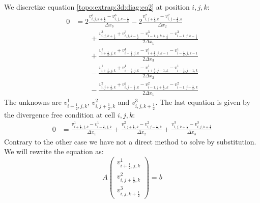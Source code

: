 We discretize equation \ref{topo:extrap:3d:diag:eq2} at position $i,j,k$:
\begin{equation}\label{extrap:3d:3:eq2}
 \begin{split}
	0&=2\frac{v^{3}_{i,j,k+\frac{1}{2}}-v^{3}_{i,j,k-\frac{1}{2}}}{\Delta x_3}-2\frac{v^{2}_{i,j+\frac{1}{2}.k}-v^{2}_{i,j-\frac{1}{2},k}}{\Delta x_2}\\
	&\qquad +\frac{v^{3}_{i,j,k+\frac{1}{2}}+v^{3}_{i,j,k-\frac{1}{2}}-v^{3}_{i-1,j,k+\frac{1}{2}}-v^{3}_{i-1,j,k-\frac{1}{2}}}{2\Delta x_1}\\
	&\qquad +\frac{v^{1}_{i+\frac{1}{2},j,k}+v^1_{i-\frac{1}{2},j,k}-v^{1}_{i+\frac{1}{2},j,k-1}-v^{1}_{i-\frac{1}{2},j,k-1}}{2\Delta x_3}\\
	&\qquad -\frac{v^{1}_{i+\frac{1}{2},j,k}+v^{1}_{i-\frac{1}{2},j,k}-v^{1}_{i+\frac{1}{2},j-1,k}-v^{1}_{i-\frac{1}{2},j-1,k}}{2\Delta x_2}\\
	&\qquad -\frac{v^{2}_{i,j+\frac{1}{2},k}+v^2_{i,j-\frac{1}{2},k}-v^{2}_{i-1,j+\frac{1}{2},k}-v^{2}_{i-1,j-\frac{1}{2},k}}{2\Delta x_1}
\end{split}
	\end{equation}
The unknowns are $v^{1}_{i+\frac{1}{2},j,k}$, $v^2_{i,j+\frac{1}{2},k}$ and $v^{3}_{i,j,k+\frac{1}{2}}$.
The last equation is given by the divergence free condition at cell $i,j,k$:
\begin{align}\label{extrap:3d:3:div}
 0&=\frac{v^{1}_{i+\frac{1}{2},j,k}-v^{1}_{i-\frac{1}{2},j,k}}{\Delta x_1}+\frac{v^{2}_{i,j+\frac{1}{2},k}-v^{2}_{i,j-\frac{1}{2},k}}{\Delta x_2}+\frac{v^{3}_{i,j,k+\frac{1}{2}}-v^{3}_{i,j,k+\frac{1}{2}}}{\Delta x_3}
\end{align}
Contrary to the other case we have not a direct method to solve by substitution. We will rewrite the equation as:
\begin{equation}
 A\begin{pmatrix}
   v^{1}_{i+\frac{1}{2},j,k}\\
   v^2_{i,j+\frac{1}{2},k}\\
   v^{3}_{i,j,k+\frac{1}{2}}
  \end{pmatrix}=b
\end{equation}

